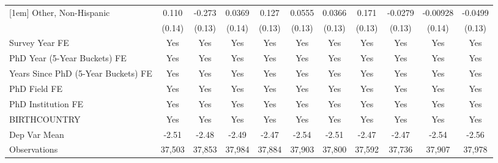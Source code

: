 \begin{table}[htbp]
\begin{tabular}{l*{10}{c}}
[1em]
Other, Non-Hispanic&       0.110         &      -0.273\sym{**} &      0.0369         &       0.127         &      0.0555         &      0.0366         &       0.171         &     -0.0279         &    -0.00928         &     -0.0499         \\
  &      (0.14)         &      (0.13)         &      (0.14)         &      (0.13)         &      (0.13)         &      (0.13)         &      (0.13)         &      (0.13)         &      (0.14)         &      (0.13)         \\
[1em]
Survey Year FE&         Yes         &         Yes         &         Yes         &         Yes         &         Yes         &         Yes         &         Yes         &         Yes         &         Yes         &         Yes         \\
[1em]
PhD Year (5-Year Buckets) FE&         Yes         &         Yes         &         Yes         &         Yes         &         Yes         &         Yes         &         Yes         &         Yes         &         Yes         &         Yes         \\
[1em]
Years Since PhD (5-Year Buckets) FE&         Yes         &         Yes         &         Yes         &         Yes         &         Yes         &         Yes         &         Yes         &         Yes         &         Yes         &         Yes         \\
[1em]
PhD Field FE&         Yes         &         Yes         &         Yes         &         Yes         &         Yes         &         Yes         &         Yes         &         Yes         &         Yes         &         Yes         \\
[1em]
PhD Institution FE&         Yes         &         Yes         &         Yes         &         Yes         &         Yes         &         Yes         &         Yes         &         Yes         &         Yes         &         Yes         \\
[1em]
BIRTHCOUNTRY&         Yes         &         Yes         &         Yes         &         Yes         &         Yes         &         Yes         &         Yes         &         Yes         &         Yes         &         Yes         \\
\hline
Dep Var Mean&       -2.51         &       -2.48         &       -2.49         &       -2.47         &       -2.54         &       -2.51         &       -2.47         &       -2.47         &       -2.54         &       -2.56         \\
Observations&      37,503         &      37,853         &      37,984         &      37,884         &      37,903         &      37,800         &      37,592         &      37,736         &      37,907         &      37,978         \\

\end{tabular}
\end{table}
